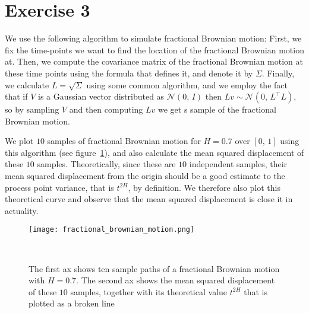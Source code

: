 \documentclass{amsart}
\theoremstyle{plain}
\theoremstyle{definition}
\theoremstyle{definition}
\theoremstyle{remark}
\begin{document}
\section{Exercise 3}
We use the following algorithm to simulate fractional Brownian motion: First, we fix the time-points we want to find the location of the fractional Brownian motion at. Then, we compute the covariance matrix of the fractional Brownian motion at these time points using the formula that defines it, and denote it by \(\Sigma\). Finally, we calculate \(L = \sqrt{\Sigma}\) using some common algorithm, and we employ the fact that if \(V\) is a Gaussian vector distributed as
\(\mathcal{N}\left(0,\,I\right)\) then \(Lv \sim \mathcal{N}\left(0,\,L^{\top}L\right)\), so by sampling \(V\) and then computing \(Lv\) we get s sample of the fractional Brownian motion.

We plot \(10\) samples of fractional Brownian motion for \(H=0.7\) over \(\left[0,\,1\right]\) using this algorithm (see figure~\ref{fig:fractional-brownian-motion}), and also calculate the mean squared displacement of these \(10\) samples. Theoretically, since these are \(10\) independent samples, their mean squared displacement from the origin should be a good estimate to the process point variance, that is \(t^{2H}\), by definition. We therefore also plot this theoretical curve and
observe that the mean squared displacement is close it in actuality.


\begin{figure}
    \texttt{[image: fractional\_brownian\_motion.png]}
    \caption{The first ax shows ten sample paths of a fractional Brownian motion with \(H=0.7\). The second ax shows the mean squared displacement of these \(10\) samples, together with its theoretical value \(t^{2H}\) that is plotted as a broken line}~\label{fig:fractional-brownian-motion}
\end{figure}
\end{document}
